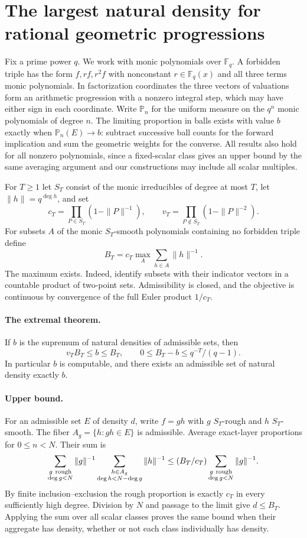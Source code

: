 \section{The largest natural density for rational geometric progressions}
Fix a prime power $q$. We work with monic polynomials over $\mathbb F_q$. A forbidden triple has the form $f,rf,r^2f$ with nonconstant $r\in\mathbb F_q(x)$ and all three terms monic polynomials. In factorization coordinates the three vectors of valuations form an arithmetic progression with a nonzero integral step, which may have either sign in each coordinate. Write $\mathbb P_n$ for the uniform measure on the $q^n$ monic polynomials of degree $n$. The limiting proportion in balls exists with value $b$ exactly when $\mathbb P_n(E)\to b$: subtract successive ball counts for the forward implication and sum the geometric weights for the converse. All results also hold for all nonzero polynomials, since a fixed-scalar class gives an upper bound by the same averaging argument and our constructions may include all scalar multiples.

For $T\ge1$ let $S_T$ consist of the monic irreducibles of degree at most $T$, let $\|h\|=q^{\deg h}$, and set
\[
 c_T=\prod_{P\in S_T}(1-\|P\|^{-1}),\qquad
 v_T=\prod_{P\notin S_T}(1-\|P\|^{-2}).
\]
For subsets $A$ of the monic $S_T$-smooth polynomials containing no forbidden triple define
\[
 B_T=c_T\max_A\sum_{h\in A}\|h\|^{-1}.
\]
The maximum exists. Indeed, identify subsets with their indicator vectors in a countable product of two-point sets. Admissibility is closed, and the objective is continuous by convergence of the full Euler product $1/c_T$.

\paragraph{The extremal theorem.}
If $b$ is the supremum of natural densities of admissible sets, then
\[
 v_T B_T\le b\le B_T,\qquad
 0\le B_T-b\le q^{-T}/(q-1).
\]
In particular $b$ is computable, and there exists an admissible set of natural density exactly $b$.

\paragraph{Upper bound.}
For an admissible set $E$ of density $d$, write $f=gh$ with $g$ $S_T$-rough and $h$ $S_T$-smooth. The fiber $A_g=\{h:gh\in E\}$ is admissible. Average exact-layer proportions for $0\le n<N$. Their sum is
\[
 \sum_{\substack{g\ {\rm rough}\\\deg g<N}}\|g\|^{-1}
 \sum_{\substack{h\in A_g\\\deg h<N-\deg g}}\|h\|^{-1}
 \le (B_T/c_T)\sum_{\substack{g\ {\rm rough}\\\deg g<N}}\|g\|^{-1}.
\]
By finite inclusion--exclusion the rough proportion is exactly $c_T$ in every sufficiently high degree. Division by $N$ and passage to the limit give $d\le B_T$. Applying the sum over all scalar classes proves the same bound when their aggregate has density, whether or not each class individually has density.


